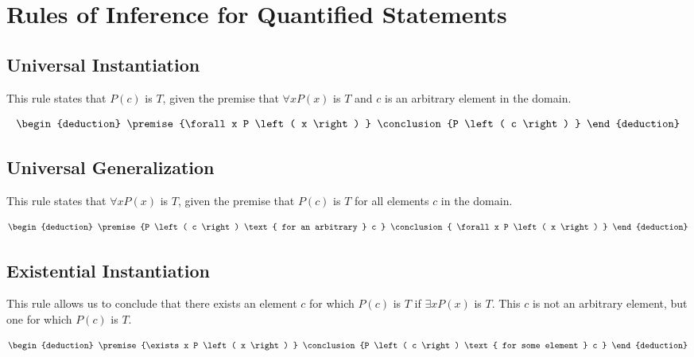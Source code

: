 \documentclass[12pt letter]{report}
\begin{document}
\section{Rules of Inference for Quantified Statements}

\subsection{Universal Instantiation}

This rule states that $P \left( c \right) $ is $T$, given the premise that $\forall x P \left( x \right) $ is $T$ and
$c$ is an arbitrary element in the domain.

\begin{align*}
	\begin{deduction}
		\premise{\forall x P \left( x \right) }
		\conclusion{P \left( c \right) }
	\end{deduction}
\end{align*}

\subsection{Universal Generalization}

This rule states that $\forall x P \left( x \right) $ is $T$, given the premise that $P \left( c \right) $ is $T$  for
all elements $c$ in the domain.


\begin{align*}
	\begin{deduction}
		\premise{P \left( c \right) \text{ for an arbitrary } c }
		\conclusion{ \forall x P \left( x \right)  }
	\end{deduction}
\end{align*}

\subsection{Existential Instantiation}

This rule allows us to conclude that there exists an element $c$ for which $P \left( c \right) $ is $T$ if $\exists x P
	\left( x \right) $ is $T$. This $c$ is not an arbitrary element, but one for which $P \left( c \right) $ is $T$.

\begin{align*}
	\begin{deduction}
		\premise{\exists x P \left( x \right) }
		\conclusion{P \left( c \right) \text{ for some element } c }
	\end{deduction}
\end{align*}
\end{document}
